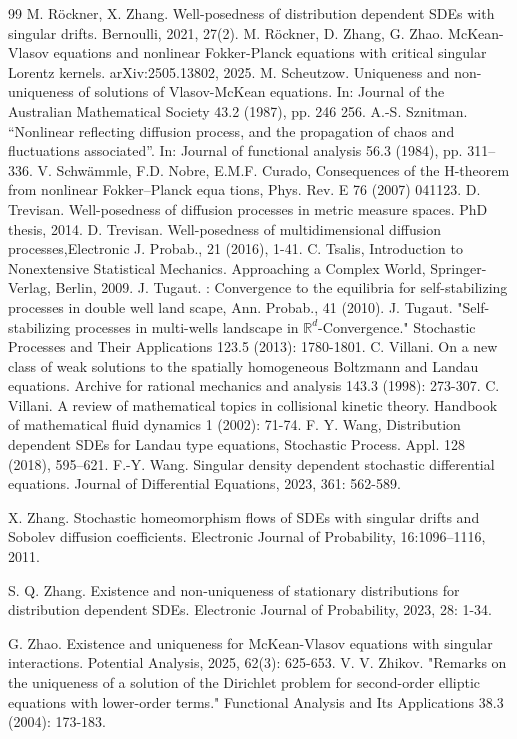 \documentclass[UTF-8,reqno]{amsart}
\numberwithin{equation}{section}
\theoremstyle{definition}
\begin{document}
\begin{thebibliography}{99}
M. R\"ockner, X. Zhang. Well-posedness of distribution dependent SDEs with singular drifts. Bernoulli, 2021, 27(2).
M. R\"ockner, D. Zhang, G. Zhao. McKean-Vlasov equations and nonlinear Fokker-Planck equations with critical singular Lorentz kernels.  arXiv:2505.13802, 2025.
M. Scheutzow. Uniqueness and non-uniqueness of solutions of Vlasov-McKean
equations. In: Journal of the Australian Mathematical Society 43.2 (1987), pp. 246
256.
A.-S. Sznitman. “Nonlinear reflecting diffusion process, and the propagation of
chaos and fluctuations associated”. In: Journal of functional analysis 56.3 (1984),
pp. 311–336.
 V. Schwämmle, F.D. Nobre, E.M.F. Curado, Consequences of the H-theorem from nonlinear Fokker–Planck equa
tions, Phys. Rev. E 76 (2007) 041123.
D. Trevisan. Well-posedness of diffusion processes in metric measure spaces. PhD thesis, 2014.
D. Trevisan. Well-posedness of multidimensional diffusion processes,Electronic J. Probab., 21 (2016), 1-41.
C. Tsalis, Introduction to Nonextensive Statistical Mechanics. Approaching a Complex World, Springer-Verlag, 
Berlin, 2009.
J. Tugaut. : Convergence to the equilibria for self-stabilizing processes in double well land
scape, Ann. Probab., 41 (2010).
J. Tugaut. "Self-stabilizing processes in multi-wells landscape in $\mathbb{R}^d$-Convergence." Stochastic Processes and Their Applications 123.5 (2013): 1780-1801.
C. Villani. On a new class of weak solutions to the spatially homogeneous Boltzmann and Landau equations. Archive for rational mechanics and analysis 143.3 (1998): 273-307.
C. Villani. A review of mathematical topics in collisional kinetic theory. Handbook of mathematical fluid dynamics 1 (2002): 71-74.
F. Y. Wang, Distribution dependent SDEs for Landau type equations, Stochastic Process. Appl. 128 (2018), 595–621.
F.-Y. Wang. Singular density dependent stochastic differential equations. Journal of Differential Equations, 2023, 361: 562-589.
 
X. Zhang. Stochastic homeomorphism flows of SDEs with singular drifts and Sobolev diffusion coefficients. Electronic Journal of Probability, 16:1096–1116, 2011.

S. Q. Zhang. Existence and non-uniqueness of stationary distributions for distribution dependent SDEs. Electronic Journal of Probability, 2023, 28: 1-34.
 
 G. Zhao. Existence and uniqueness for McKean-Vlasov equations with singular interactions. Potential Analysis, 2025, 62(3): 625-653.
V. V. Zhikov. "Remarks on the uniqueness of a solution of the Dirichlet problem for second-order elliptic equations with lower-order terms." Functional Analysis and Its Applications 38.3 (2004): 173-183.
\end{thebibliography}
\end{document}
